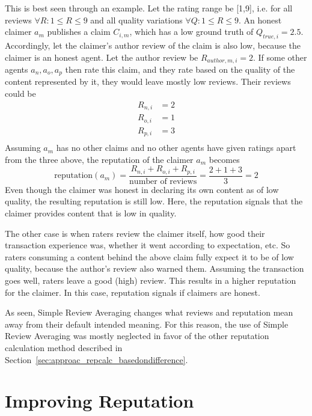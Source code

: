 \documentclass[%
    ]{\PathToTumTemplate/thesis/tum_thesis}
\begin{document}
This is best seen through an example.
Let the rating range be [1,9], i.e. for all reviews $\forall R: 1\leq R \leq 9$ and all quality variations $\forall Q: 1\leq R \leq 9$.
An honest claimer $a_m$ publishes a claim $C_{i,m}$, which has a low ground truth of $Q_{true,i}=2.5$.
Accordingly, let the claimer's author review of the claim is also low, because the claimer is an honest agent.
Let the author review be $R_{author,m,i}=2$.
If some other agents $a_n, a_o, a_p$ then rate this claim, and they rate based on the quality of the content represented by it, they would leave mostly low reviews.
Their reviews could be
\begin{equation}
\begin{aligned}
R_{n,i} &= 2 \\
R_{o,i} &= 1 \\
R_{p,i} &= 3 \\
\end{aligned}
\end{equation}
Assuming $a_m$ has no other claims and no other agents have given ratings apart from the three above, the reputation of the claimer $a_m$ becomes
\begin{equation}
\mathrm{reputation}(a_{m})=\frac{R_{n,i}+R_{o,i}+R_{p,i}}{\text{number of reviews}} = \frac{2+1+3}{3} = 2
\end{equation}
Even though the claimer was honest in declaring its own content as of low quality, the resulting reputation is still low.
Here, the reputation signals that the claimer provides content that is low in quality.

The other case is when raters review the claimer itself, how good their transaction experience was, whether it went according to expectation, etc.
So raters consuming a content behind the above claim fully expect it to be of low quality, because the author's review also warned them.
Assuming the transaction goes well, raters leave a good (high) review.
This results in a higher reputation for the claimer.
In this case, reputation signals if claimers are honest.

As seen, Simple Review Averaging changes what reviews and reputation mean away from their default intended meaning.
For this reason, the use of Simple Review Averaging was mostly neglected in favor of the other reputation calculation method described in Section~\ref{sec:approac_repcalc_basedondifference}.



\section{Improving Reputation}\label{sec:approach_improvements}
\end{document}
